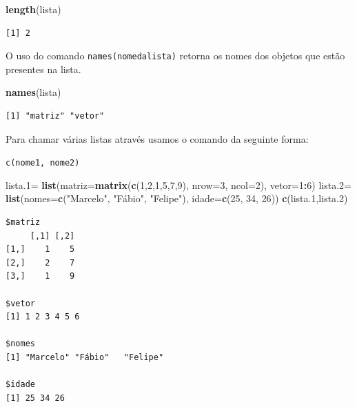\documentclass[12pt,brazil,oneside]{book}
\newenvironment{Shaded}{\begin{snugshade}}{\end{snugshade}}
\newcommand{\DataTypeTok}[1]{\textcolor[rgb]{0.13,0.29,0.53}{#1}}
\newcommand{\DecValTok}[1]{\textcolor[rgb]{0.00,0.00,0.81}{#1}}
\newcommand{\FloatTok}[1]{\textcolor[rgb]{0.00,0.00,0.81}{#1}}
\newcommand{\KeywordTok}[1]{\textcolor[rgb]{0.13,0.29,0.53}{\textbf{#1}}}
\newcommand{\NormalTok}[1]{#1}
\newcommand{\OperatorTok}[1]{\textcolor[rgb]{0.81,0.36,0.00}{\textbf{#1}}}
\newcommand{\StringTok}[1]{\textcolor[rgb]{0.31,0.60,0.02}{#1}}
\begin{document}
\begin{Shaded}
\begin{Highlighting}[]
\KeywordTok{length}\NormalTok{(lista)}
\end{Highlighting}
\end{Shaded}

\begin{verbatim}
[1] 2
\end{verbatim}

O uso do comando \texttt{names(nomedalista)} retorna os nomes dos
objetos que estão presentes na lista.

\begin{Shaded}
\begin{Highlighting}[]
\KeywordTok{names}\NormalTok{(lista)}
\end{Highlighting}
\end{Shaded}

\begin{verbatim}
[1] "matriz" "vetor" 
\end{verbatim}

Para chamar várias listas através usamos o comando da seguinte forma:

\texttt{c(nome1,\ nome2)}

\begin{Shaded}
\begin{Highlighting}[]
\NormalTok{lista}\FloatTok{.1}\NormalTok{=}\StringTok{ }\KeywordTok{list}\NormalTok{(}\DataTypeTok{matriz=}\KeywordTok{matrix}\NormalTok{(}\KeywordTok{c}\NormalTok{(}\DecValTok{1}\NormalTok{,}\DecValTok{2}\NormalTok{,}\DecValTok{1}\NormalTok{,}\DecValTok{5}\NormalTok{,}\DecValTok{7}\NormalTok{,}\DecValTok{9}\NormalTok{), }\DataTypeTok{nrow=}\DecValTok{3}\NormalTok{, }\DataTypeTok{ncol=}\DecValTok{2}\NormalTok{),}
              \DataTypeTok{vetor=}\DecValTok{1}\OperatorTok{:}\DecValTok{6}\NormalTok{)}
\NormalTok{lista}\FloatTok{.2}\NormalTok{=}\StringTok{ }\KeywordTok{list}\NormalTok{(}\DataTypeTok{nomes=}\KeywordTok{c}\NormalTok{(}\StringTok{"Marcelo"}\NormalTok{, }\StringTok{"Fábio"}\NormalTok{, }\StringTok{"Felipe"}\NormalTok{), }
              \DataTypeTok{idade=}\KeywordTok{c}\NormalTok{(}\DecValTok{25}\NormalTok{, }\DecValTok{34}\NormalTok{, }\DecValTok{26}\NormalTok{))}
\KeywordTok{c}\NormalTok{(lista}\FloatTok{.1}\NormalTok{,lista}\FloatTok{.2}\NormalTok{)}
\end{Highlighting}
\end{Shaded}

\begin{verbatim}
$matriz
     [,1] [,2]
[1,]    1    5
[2,]    2    7
[3,]    1    9

$vetor
[1] 1 2 3 4 5 6

$nomes
[1] "Marcelo" "Fábio"   "Felipe" 

$idade
[1] 25 34 26
\end{verbatim}
\end{document}
